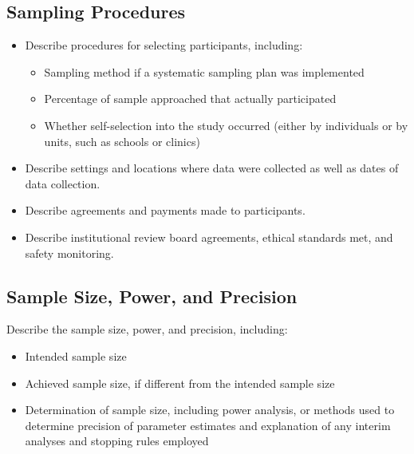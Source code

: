 \documentclass[acmsmall]{acmart}
\begin{document}

\subsection{Sampling Procedures}

\begin{itemize}
    \item Describe procedures for selecting participants, including:
    \begin{itemize}
        \item Sampling method if a systematic sampling plan was implemented
        \item Percentage of sample approached that actually participated
        \item Whether self-selection into the study occurred (either by individuals or by units, such as schools or clinics)
    \end{itemize}
    \item Describe settings and locations where data were collected as well as dates of data collection.
    \item Describe agreements and payments made to participants.
    \item Describe institutional review board agreements, ethical standards met, and safety monitoring.
\end{itemize}

\subsection{Sample Size, Power, and Precision}
Describe the sample size, power, and precision, including:
\begin{itemize}
    \item Intended sample size
    \item Achieved sample size, if different from the intended sample size
    \item Determination of sample size, including power analysis, or methods used to determine precision of parameter estimates and explanation of any interim analyses and stopping rules employed
\end{itemize}
\end{document}
